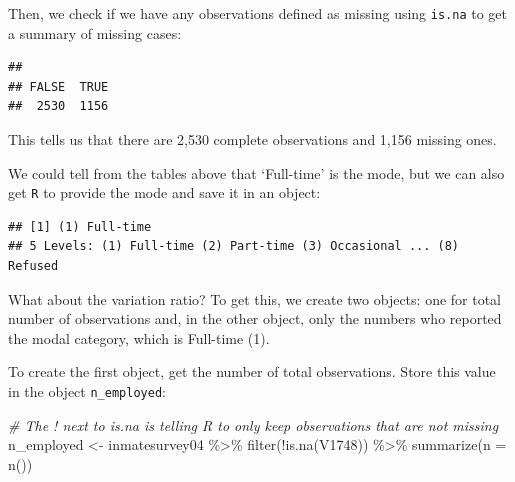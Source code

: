 \documentclass[
]{book}
\newenvironment{Shaded}{\begin{snugshade}}{\end{snugshade}}
\newcommand{\AttributeTok}[1]{\textcolor[rgb]{0.77,0.63,0.00}{#1}}
\newcommand{\CommentTok}[1]{\textcolor[rgb]{0.56,0.35,0.01}{\textit{#1}}}
\newcommand{\ConstantTok}[1]{\textcolor[rgb]{0.00,0.00,0.00}{#1}}
\newcommand{\FunctionTok}[1]{\textcolor[rgb]{0.00,0.00,0.00}{#1}}
\newcommand{\NormalTok}[1]{#1}
\newcommand{\OtherTok}[1]{\textcolor[rgb]{0.56,0.35,0.01}{#1}}
\newcommand{\SpecialCharTok}[1]{\textcolor[rgb]{0.00,0.00,0.00}{#1}}
\begin{document}
\begin{Shaded}
\end{Shaded}

Then, we check if we have any observations defined as missing using \texttt{is.na} to get a summary of missing cases:

\begin{Shaded}
\end{Shaded}

\begin{verbatim}
## 
## FALSE  TRUE 
##  2530  1156
\end{verbatim}

This tells us that there are 2,530 complete observations and 1,156 missing ones.

We could tell from the tables above that `Full-time' is the mode, but we can also get \texttt{R} to provide the mode and save it in an object:

\begin{Shaded}
\end{Shaded}

\begin{verbatim}
## [1] (1) Full-time
## 5 Levels: (1) Full-time (2) Part-time (3) Occasional ... (8) Refused
\end{verbatim}

What about the variation ratio? To get this, we create two objects: one for total number of observations and, in the other object, only the numbers who reported the modal category, which is Full-time (1).

To create the first object, get the number of total observations. Store this value in the object \texttt{n\_employed}:

\begin{Shaded}
\begin{Highlighting}[]
\CommentTok{\# The \textquotesingle{}!\textquotesingle{} next to \textquotesingle{}is.na\textquotesingle{} is telling R to only keep observations that are not missing}
\NormalTok{n\_employed }\OtherTok{\textless{}{-}}\NormalTok{ inmatesurvey04 }\SpecialCharTok{\%\textgreater{}\%} 
  \FunctionTok{filter}\NormalTok{(}\SpecialCharTok{!}\FunctionTok{is.na}\NormalTok{(V1748)) }\SpecialCharTok{\%\textgreater{}\%} 
  \FunctionTok{summarize}\NormalTok{(}\AttributeTok{n =} \FunctionTok{n}\NormalTok{())}
\end{Highlighting}
\end{Shaded}
\end{document}
